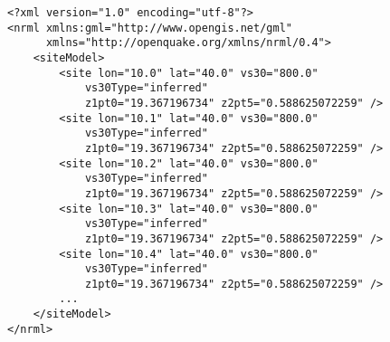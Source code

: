 \begin{Verbatim}[frame=single, commandchars=\\\{\}, fontsize=\small]
<?xml version="1.0" encoding="utf-8"?>
<nrml xmlns:gml="http://www.opengis.net/gml"
      xmlns="http://openquake.org/xmlns/nrml/0.4">
    <siteModel>
        <site lon="10.0" lat="40.0" vs30="800.0" 
            vs30Type="inferred" 
            z1pt0="19.367196734" z2pt5="0.588625072259" />
        <site lon="10.1" lat="40.0" vs30="800.0" 
            vs30Type="inferred" 
            z1pt0="19.367196734" z2pt5="0.588625072259" />
        <site lon="10.2" lat="40.0" vs30="800.0" 
            vs30Type="inferred" 
            z1pt0="19.367196734" z2pt5="0.588625072259" />
        <site lon="10.3" lat="40.0" vs30="800.0" 
            vs30Type="inferred" 
            z1pt0="19.367196734" z2pt5="0.588625072259" />
        <site lon="10.4" lat="40.0" vs30="800.0" 
            vs30Type="inferred" 
            z1pt0="19.367196734" z2pt5="0.588625072259" />
        ...
    </siteModel>
</nrml>
\end{Verbatim}
